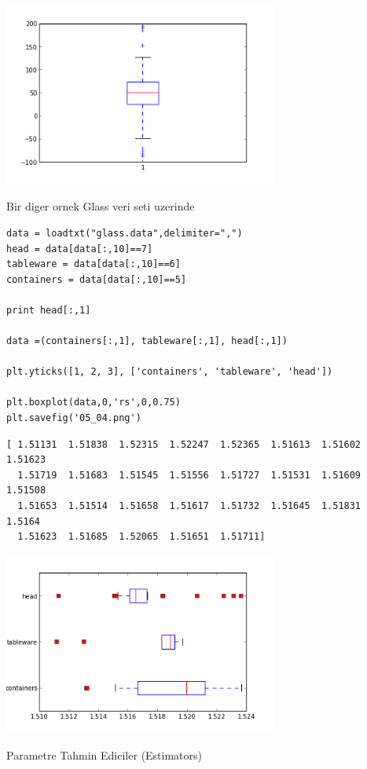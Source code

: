 \documentclass[12pt,fleqn]{article}\usepackage{../common}
\begin{document}
\includegraphics[height=6cm]{05_03.png}

Bir diger ornek Glass veri seti uzerinde

\begin{verbatim}
data = loadtxt("glass.data",delimiter=",")
head = data[data[:,10]==7]
tableware = data[data[:,10]==6]
containers = data[data[:,10]==5]

print head[:,1]

data =(containers[:,1], tableware[:,1], head[:,1])

plt.yticks([1, 2, 3], ['containers', 'tableware', 'head'])

plt.boxplot(data,0,'rs',0,0.75)
plt.savefig('05_04.png')
\end{verbatim}

\begin{verbatim}
[ 1.51131  1.51838  1.52315  1.52247  1.52365  1.51613  1.51602  1.51623
  1.51719  1.51683  1.51545  1.51556  1.51727  1.51531  1.51609  1.51508
  1.51653  1.51514  1.51658  1.51617  1.51732  1.51645  1.51831  1.5164
  1.51623  1.51685  1.52065  1.51651  1.51711]
\end{verbatim}

\includegraphics[height=6cm]{05_04.png}

Parametre Tahmin Ediciler (Estimators) 
\end{document}
